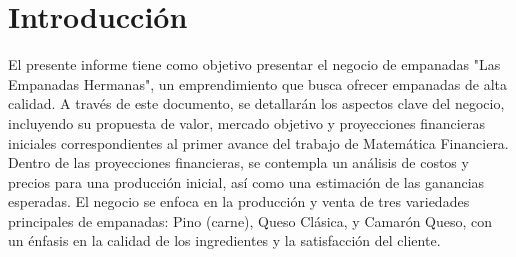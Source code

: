 \documentclass[12pt]{article}
\begin{document}

\section{Introducción} %
El presente informe tiene como objetivo presentar el negocio de empanadas "Las Empanadas Hermanas", un emprendimiento que busca ofrecer empanadas de alta calidad. A través de este documento, se detallarán los aspectos clave del negocio, incluyendo su propuesta de valor, mercado objetivo y proyecciones financieras iniciales correspondientes al primer avance del trabajo de Matemática Financiera. \\

Dentro de las proyecciones financieras, se contempla un análisis de costos y precios para una producción inicial, así como una estimación de las ganancias esperadas. El negocio se enfoca en la producción y venta de tres variedades principales de empanadas: Pino (carne), Queso Clásica, y Camarón Queso, con un énfasis en la calidad de los ingredientes y la satisfacción del cliente. \\ %
\end{document}
